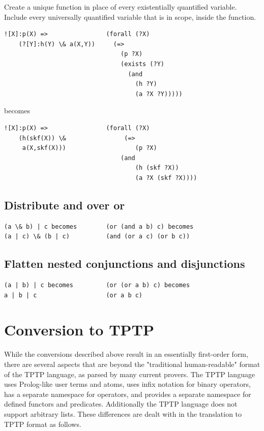 \documentclass{book}
\begin{document}
Create a unique function in place of every existentially quantified variable.
Include every universally quantified variable that is in scope, inside the
function.

\begin{verbatim}
![X]:p(X) =>  		        (forall (?X)
    (?[Y]:h(Y) \& a(X,Y))	  (=>
    		  				    (p ?X)
	        				    (exists (?Y)
	        				      (and
	        				        (h ?Y)
	            					(a ?X ?Y)))))
\end{verbatim}	
					  
becomes		

\begin{verbatim}
![X]:p(X) => 	            (forall (?X)
    (h(skf(X)) \&                (=>
     a(X,skf(X)))			        (p ?X)
     			  			    (and
						            (h (skf ?X))
						            (a ?X (skf ?X))))
\end{verbatim}


\subsection{Distribute and over or}

\begin{verbatim}
(a \& b) | c becomes 		(or (and a b) c) becomes
(a | c) \& (b | c)		 	(and (or a c) (or b c))
\end{verbatim}

\subsection{Flatten nested conjunctions and disjunctions}

\begin{verbatim}
(a | b) | c becomes 		(or (or a b) c) becomes
a | b | c				    (or a b c)
\end{verbatim}



\section{Conversion to TPTP}
\label{chap:SUMOInfe:sec:Conv}

While the conversions described above result in an essentially first-order form,
there are several aspects that are beyond the "traditional human-readable"
format of the TPTP language, as parsed by many current provers. The TPTP
language uses Prolog-like user terms and atoms, uses infix
notation for binary operators, has a separate namespace for operators, and
provides a separate namespace for defined functors and predicates. Additionally
the TPTP language does not support arbitrary lists. These differences are dealt
with in the translation to TPTP format as follows.
\end{document}
